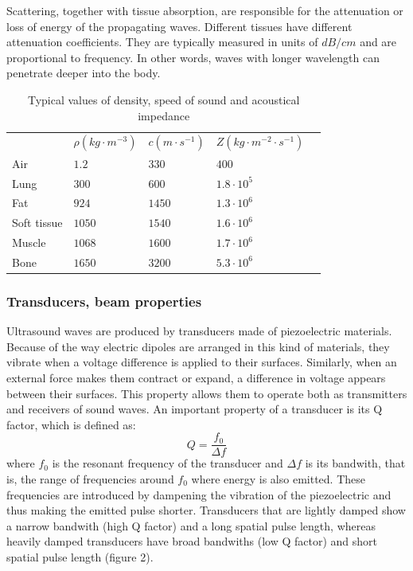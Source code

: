 \documentclass[11pt]{article} %
\begin{document}
	
	Scattering, together with tissue absorption, are responsible for the attenuation or loss of energy of the propagating waves. Different tissues have different attenuation coefficients. They are typically measured in units of $dB/cm$ and are proportional to frequency. In other words, waves with longer wavelength can penetrate deeper into the body. \cite{bushberg}

\begin{table}[]
\centering
\begin{tabular}{l|l|l|l|l}
            & $  \rho (kg  \cdot m^{-3})$ & $c (m \cdot s^{-1})$ & $Z (kg \cdot m^{-2} \cdot s^{-1})$ &  \\ \cline{1-4}
Air         & $1.2$                       & $330$                & $400$                              &  \\
Lung        & $300$                       & $600$                & $1.8 \cdot 10^5$                   &  \\
Fat         & $924$                       & $1450$                & $1.3 \cdot 10^6$                   &  \\
Soft tissue & $1050$                      & $1540$               & $1.6 \cdot 10^6$                   &  \\
Muscle      & $1068$                      & $1600$               & $1.7 \cdot 10^6$                   & \\
Bone        & $1650$                      & $3200$               & $5.3 \cdot 10^6$                   & 
\end{tabular}
\caption{Typical values of density, speed of sound and acoustical impedance \cite{farr}}
\end{table}


\subsubsection{Transducers, beam properties}


	Ultrasound waves are produced by transducers made of piezoelectric materials. Because of the way electric dipoles are arranged in this kind of materials, they vibrate when a voltage difference is applied to their surfaces. Similarly, when an external force makes them contract or expand, a difference in voltage appears between their surfaces. This property allows them to operate both as transmitters and receivers of sound waves. An important property of a transducer is its Q factor, which is defined as: \[ Q = \frac{f_0}{\Delta f} \] where $f_0$ is the resonant frequency of the transducer and $ \Delta f$ is its bandwith, that is, the range of frequencies around $f_0$ where energy is also emitted. These frequencies are introduced by dampening the vibration of the piezoelectric and thus making the emitted pulse shorter. Transducers that are lightly damped show a  narrow bandwith (high Q factor) and a long spatial pulse length, whereas heavily damped transducers have broad bandwiths (low Q factor) and short spatial pulse length (figure 2). 
\end{document}
